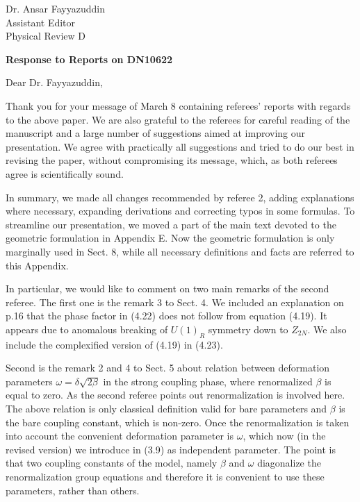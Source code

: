 \documentclass[a4paper,12pt]{article}
\begin{document}
{
\flushleft
Dr. Ansar Fayyazuddin\\
Assistant Editor\\
Physical Review D
}

\vspace{1.5cm}
\centerline{
\Large\bf
Response to Reports on DN10622
}

\vspace{0.7cm}
Dear Dr. Fayyazuddin,
\vspace{0.45cm}

Thank you for your message of March 8 containing referees' reports with
regards to the above paper.
We are also grateful to the referees for careful reading of the manuscript
and a large number of suggestions aimed at improving our presentation. 
We agree with practically all suggestions and tried to do our best in revising 
the paper, without compromising its message, which, as both referees agree is 
scientifically sound.

In summary, we made all changes recommended by referee 2, adding explanations
where necessary, expanding derivations and correcting typos in some formulas.
To streamline our presentation, we moved a part of the main text devoted
to the geometric formulation in Appendix E. Now the geometric formulation is only 
marginally used in Sect. 8, while all necessary definitions and facts are 
referred to this Appendix.

In particular, we would like to comment on two main remarks of the second
referee. The first one is the remark 3 to Sect. 4. We included an explanation
on p.16 that the phase factor in (4.22) does not follow from equation
(4.19). It appears due to anomalous breaking of $U(1)_R$ symmetry down to
$Z_{2N}$. We also include the complexified version of (4.19) in (4.23).

Second is the remark 2 and 4 to Sect. 5 about relation between
deformation parameters $\omega = \delta \sqrt{2\beta}$ in the strong
coupling phase, where renormalized $\beta$ is equal to zero. As the second
referee points out renormalization is involved here. The above relation
is only classical definition valid for bare parameters and $\beta$ is
the bare coupling constant, which is non-zero. Once the renormalization is
taken into account the convenient deformation parameter is $\omega$,
which now (in the revised version) we introduce in (3.9) as independent
parameter. The point is that two coupling constants of the model,
namely $\beta$ and $\omega$ diagonalize the renormalization group
equations and therefore it is convenient to use these parameters,
rather than others.
\end{document}
